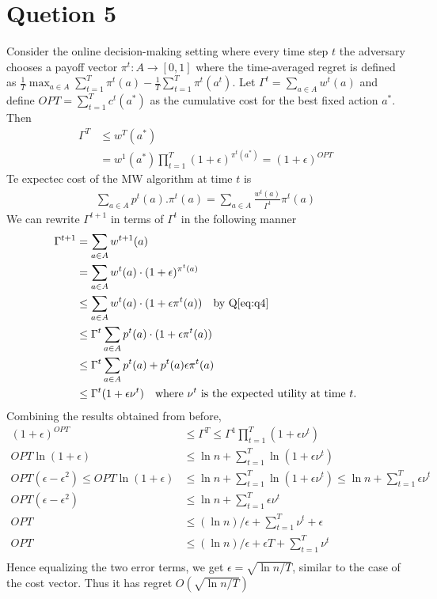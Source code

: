 \documentclass[a4paper,12pt]{article}
\theoremstyle{definition}
\begin{document}
\section*{Quetion 5}
Consider the online decision-making setting where every time step $t$ the adversary  chooses a payoff vector $\pi^t:A \to [0,1]$ where the time-averaged regret is defined as $\frac{1}{T} \max_{a\in A}\sum_{t=1}^{T}\pi^t(a)-\frac{1}{T}\sum_{t=1}^{T}\pi^t(a^t)$. Let $\Gamma^t =\sum_{a\in A}w^t(a)$ and define $OPT = \sum_{t=1}^{T}c^t(a^\ast)$ as the cumulative cost for the best fixed action $a^\ast$. Then
\begin{align*}
\Gamma^T&\leq w^T(a^\ast)\\
&=w^1(a^\ast)\prod_{t=1}^{T}(1+\epsilon)^{\pi^t(a^\ast)} = (1+\epsilon)^{OPT}
\end{align*}
Te expectec cost of the MW algorithm at time $t$ is 
\begin{align*}
\sum_{a \in A}p^t(a).\pi^t(a) = \sum_{a \in A}\frac{w^t(a)}{\Gamma^t}\pi^t(a) 
\end{align*}
We can rewrite $\Gamma^{t+1}$ in terms of $\Gamma^t$ in the following manner
\begin{align*}
\Gamma^{t+1} &= \sum_{a \in A}w^{t+1}(a)\\
&= \sum_{a \in A}w^{t}(a)\cdot (1+\epsilon)^{\pi^t(a)}\\
&\leq \sum_{a \in A}w^{t}(a)\cdot (1+\epsilon\pi^t(a)) \quad \text{by Q\ref{eq:q4}}\\
&\leq \Gamma^t\sum_{a \in A}p^{t}(a)\cdot (1+\epsilon\pi^t(a))\\
&\leq \Gamma^t\sum_{a \in A}p^{t}(a)+p^{t}(a)\epsilon\pi^t(a)\\
&\leq \Gamma^t(1+\epsilon\nu^t)\quad \text{where $\nu^t$ is the expected utility at time $t$.}
\end{align*}
Combining the results obtained from before,
\begin{align*}
(1+\epsilon)^{OPT}&\leq \Gamma^T\leq \Gamma^1\prod_{t=1}^{T}(1+\epsilon \nu^t)\\
OPT \ln (1+\epsilon)&\leq  \ln n + \sum_{t=1}^{T}\ln (1+\epsilon \nu^t)\\
OPT (\epsilon-\epsilon^2)\leq OPT \ln (1+\epsilon)&\leq  \ln n + \sum_{t=1}^{T}\ln (1+\epsilon \nu^t)\leq  \ln n + \sum_{t=1}^{T}\epsilon \nu^t\\
OPT (\epsilon-\epsilon^2)&\leq   \ln n + \sum_{t=1}^{T}\epsilon \nu^t\\
OPT &\leq   (\ln n)/\epsilon + \sum_{t=1}^{T}\nu^t +\epsilon \\
OPT &\leq   (\ln n)/\epsilon +\epsilon T + \sum_{t=1}^{T}\nu^t \\
\end{align*}
Hence equalizing the two error terms, we get $\epsilon=\sqrt{\ln n/T}$, similar to the case of the cost vector. Thus it has regret $O(\sqrt{\ln n/T})$
\end{document}
